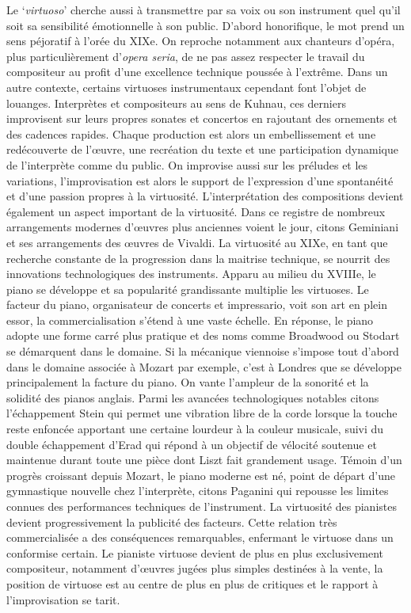 \documentclass[12pt, letterpaper, twoside]{article}
\begin{document}
\begin{spacing}{1.5}
Le `\emph{virtuoso}' cherche aussi à transmettre par sa voix ou son instrument quel qu'il soit sa sensibilité émotionnelle à son public. D'abord honorifique, le mot prend un sens péjoratif à l'orée du XIXe. On reproche notamment aux chanteurs d'opéra, plus particulièrement d'\emph{opera seria}, de ne pas assez respecter le travail du compositeur au profit d'une excellence technique poussée à l'extrême. 
Dans un autre contexte, certains virtuoses instrumentaux cependant font l'objet de louanges. Interprètes et compositeurs au sens de Kuhnau, ces derniers improvisent sur leurs propres sonates et concertos en rajoutant des ornements et des cadences rapides. Chaque production est alors un embellissement et une redécouverte de l'\oe{}uvre, une recréation du texte et une participation dynamique de l'interprète comme du public. On improvise aussi sur les préludes et les variations, l'improvisation est alors le support de l'expression d'une spontanéité et d'une passion propres à la virtuosité. L'interprétation des compositions devient également un aspect important de la virtuosité. Dans ce registre de nombreux arrangements modernes d'\oe{}uvres plus anciennes voient le jour, citons Geminiani et ses arrangements des \oe{}uvres de  Vivaldi. 
La virtuosité au XIXe, en tant que recherche constante de la progression dans la maitrise technique, se nourrit des innovations technologiques des instruments. Apparu au milieu du XVIIIe, le piano se développe et sa popularité grandissante multiplie les virtuoses. Le facteur du piano, organisateur de concerts et impressario, voit son art en plein essor, la commercialisation s'étend à une vaste échelle. En réponse, le piano adopte une forme carré plus pratique et des noms comme Broadwood ou Stodart se démarquent dans le domaine. 
Si la mécanique viennoise s'impose tout d'abord dans le domaine associée à Mozart par exemple, c'est à Londres que se développe principalement la facture du piano. On vante l'ampleur de la sonorité et la solidité des pianos anglais. Parmi les avancées technologiques notables citons l'échappement Stein qui permet une vibration libre de la corde lorsque la touche reste enfoncée apportant une certaine lourdeur à la couleur musicale, suivi du double échappement d'Erad qui répond à un objectif de vélocité soutenue et maintenue durant toute une pièce dont Liszt fait grandement usage. Témoin d'un progrès croissant depuis Mozart, le piano moderne est né, point de départ d'une gymnastique nouvelle chez l'interprète, citons Paganini qui repousse les limites connues des performances techniques de l'instrument. 
La virtuosité des pianistes devient progressivement la publicité des facteurs. Cette relation très commercialisée a des conséquences remarquables, enfermant le virtuose dans un conformise certain. Le pianiste virtuose devient de plus en plus exclusivement compositeur, notamment d'\oe{}uvres jugées plus simples destinées à la vente, la position de virtuose est au centre de plus en plus de critiques et le rapport à l'improvisation se tarit. 

\end{spacing}
\end{document}
